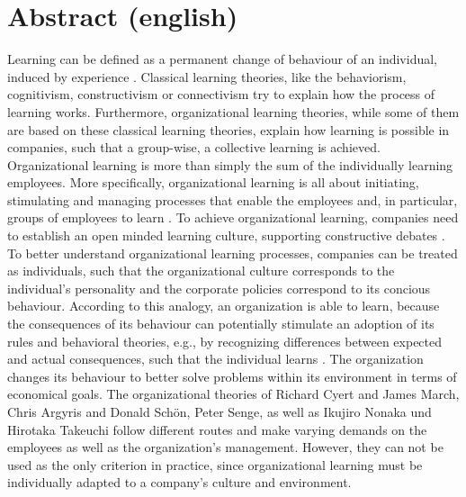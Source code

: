 \documentclass[12pt]{article}
\begin{document}
\section{Abstract (english)}

Learning can be defined as a permanent change of behaviour of an individual,
induced by experience \cite{Lefrancois:2006}. Classical learning theories, like
the behaviorism, cognitivism, constructivism or connectivism try to explain how
the process of learning works. Furthermore, organizational learning theories,
while some of them are based on these classical learning theories, explain how
learning is possible in companies, such that a group-wise, a collective
learning is achieved. Organizational learning is more than simply the sum of
the individually learning employees. More specifically, organizational learning
is all about initiating, stimulating and managing processes that enable the
employees and, in particular, groups of employees to learn \cite{Franken:2002}.
To achieve organizational learning, companies need to establish an open minded
learning culture, supporting constructive debates \cite{culture}.
To better understand organizational learning processes, companies can be
treated as individuals, such that the organizational culture corresponds to the
individual's personality and the corporate policies correspond to its concious
behaviour. According to this analogy, an organization is able to learn, because
the consequences of its behaviour can potentially stimulate an adoption of its
rules and behavioral theories, e.g., by recognizing differences between
expected and actual consequences, such that the individual learns
\cite{Pawlowsky:1992}. The organization changes its behaviour to better solve
problems within its environment in terms of economical goals. The
organizational theories of Richard Cyert and James March, Chris Argyris and
Donald Schön, Peter Senge, as well as Ikujiro Nonaka und Hirotaka Takeuchi
follow different routes and make varying demands on the employees as well as
the organization's management. However, they can not be used as the only
criterion in practice, since organizational learning must be individually
adapted to a company's culture and environment.

\nocite{*}


\end{document}
